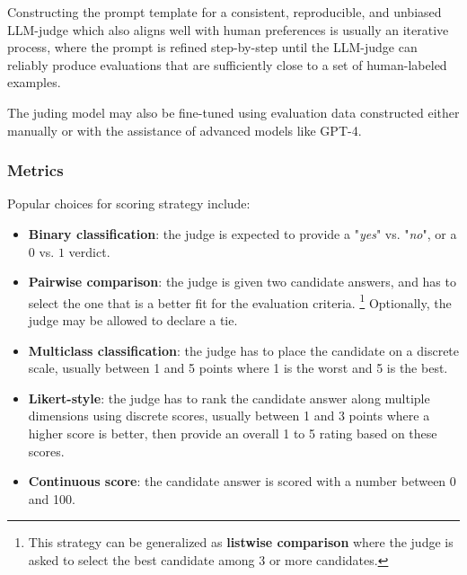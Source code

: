 \documentclass[UTF8,noindent,nohyp,parspace,titlepage,twoside,12pt]{article}
\begin{document}
        Constructing the prompt template for a consistent, reproducible, and
        unbiased LLM-judge which also aligns well with human preferences is
        usually an iterative process, where the prompt is refined step-by-step
        until the LLM-judge can reliably produce evaluations that are
        sufficiently close to a set of human-labeled examples.

        The juding model may also be fine-tuned using evaluation data
        constructed either manually or with the assistance of advanced models
        like GPT-4.

      \subsubsection{Metrics}

        Popular choices for scoring strategy include:

        \begin{itemize}
          \item \textbf{Binary classification}: the judge is expected to
                provide a "\emph{yes}" vs. "\emph{no}", or a $0$ vs. $1$
                verdict.

          \item \textbf{Pairwise comparison}: the judge is given two candidate
                answers, and has to select the one that is a better fit for the
                evaluation criteria. \footnote{This strategy can be generalized
                as \textbf{listwise comparison} where the judge is asked to
                select the best candidate among 3 or more candidates.}
                Optionally, the judge may be allowed to declare a tie.

          \item \textbf{Multiclass classification}: the judge has to place the
                candidate on a discrete scale, usually between 1 and 5 points
                where 1 is the worst and 5 is the best.

          \item \textbf{Likert-style}: the judge has to rank the candidate
                answer along multiple dimensions using discrete scores, usually
                between 1 and 3 points where a higher score is better, then
                provide an overall 1 to 5 rating based on these scores.

          \item \textbf{Continuous score}: the candidate answer is scored with
                a number between 0 and 100.
        \end{itemize}
\end{document}
